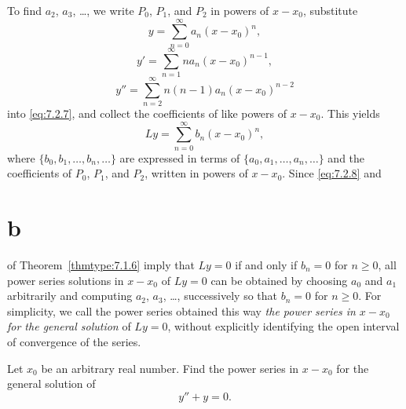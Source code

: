 To find $a_{2}$, $a_{3}$, \dots, we write $P_{0}$, $P_{1}$, and $P_{2}$ in powers of $x-x_{0}$,
substitute
\[
  y=\sum^{\infty}_{n=0}a_{n}(x-x_{0})^{n},
\]
\[
  y'=\sum^{\infty}_{n=1}na_{n}(x-x_{0})^{n-1},
\]
\[
  y''=\sum^{\infty}_{n=2}n(n-1)a_{n}(x-x_{0})^{n-2}
\]
into \eqref{eq:7.2.7}, and collect the coefficients of like powers of $x-x_{0}$. This yields
\begin{equation}
  \label{eq:7.2.8}Ly=\sum^{\infty}_{n=0}b_{n}(x-x_{0})^{n},
\end{equation}
where $\{b_{0},b_{1},\dots,b_{n},\dots\}$ are expressed in terms of
$\{a_{0},a_{1},\dots,a_{n},\dots\}$ and the coefficients of $P_{0}$, $P_{1}$, and $P_{2}$, written
in powers of $x-x_{0}$. Since \eqref{eq:7.2.8} and \part{b} of Theorem~\ref{thmtype:7.1.6} imply
that $Ly=0$ if and only if $b_{n}=0$ for $n\ge0$, all power series solutions in $x-x_{0}$ of $Ly=0$
can be obtained by choosing $a_{0}$ and $a_{1}$ arbitrarily and computing $a_{2}$, $a_{3}$, \dots,
successively so that $b_{n}=0$ for $n\ge0$. For simplicity, we call the power series obtained this
way {\color{blue}\it the power series in $x-x_{0}$ for the general solution\/} of $Ly=0$, without
explicitly identifying the open interval of convergence of the series.

\begin{example}
  \label{example:7.2.1}\rm Let $x_{0}$ be an arbitrary real number. Find the power series in
  $x-x_{0}$ for the general solution of
  \begin{equation}
    \label{eq:7.2.9}y''+y=0.
  \end{equation}
\end{example}

